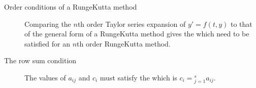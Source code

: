 \documentclass[letterpaper,10pt,english]{jupyterBook}
\begin{document}
\begin{description}
\item[{Order conditions of a Runge\sphinxhyphen{}Kutta method\label{\detokenize{8_Appendices/8.0_Cheat_sheet:term-Order-conditions-of-a-Runge-Kutta-method}}}] \leavevmode
\sphinxAtStartPar
Comparing the \(n\)th order Taylor series expansion of \(y' = f(t, y)\) to that of the general form of a Runge\sphinxhyphen{}Kutta method gives the {\hyperref[\detokenize{2_ERKs/2.1_ERK_Derivation:rk2-derivation-section}]{}} which need to be satisfied for an \(n\)th order Runge\sphinxhyphen{}Kutta method.

\item[{The row sum condition\label{\detokenize{8_Appendices/8.0_Cheat_sheet:term-The-row-sum-condition}}}] \leavevmode
\sphinxAtStartPar
The values of \(a_{ij}\) and \(c_i\) must satisfy the {\hyperref[\detokenize{2_ERKs/2.2_RK4_Derivation:row-sum-condition}]{}} which is \(c_i = \displaystyle_{j=1}^s a_{ij}\).


\end{description}
\end{document}
